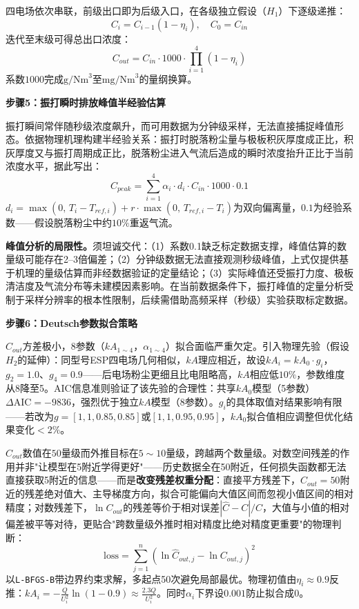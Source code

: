 四电场依次串联，前级出口即为后级入口，在各级独立假设（$H_1$）下逐级递推：
\begin{equation}
    C_i = C_{i-1}(1 - \eta_i),\quad C_0 = C_{in}
\end{equation}
迭代至末级可得总出口浓度：
\begin{equation}
    C_{out} = C_{in} \cdot 1000 \cdot \prod_{i=1}^{4}(1 - \eta_i)
\end{equation}
系数$1000$完成$\text{g/Nm}^3$至$\text{mg/Nm}^3$的量纲换算。

\textbf{步骤5：振打瞬时排放峰值半经验估算}

振打瞬间常伴随秒级浓度飙升，而可用数据为分钟级采样，无法直接捕捉峰值形态。依据物理机理构建半经验关系：振打时脱落粉尘量与极板积灰厚度成正比，积灰厚度又与振打周期成正比，脱落粉尘进入气流后造成的瞬时浓度抬升正比于当前浓度水平，据此写出：
\begin{equation}
    C_{peak} = \sum_{i=1}^{4} \alpha_i \cdot d_i \cdot C_{in} \cdot 1000 \cdot 0.1
\end{equation}
$d_i = \max(0,\, T_i - T_{ref,i}) + r \cdot \max(0,\, T_{ref,i} - T_i)$为双向偏离量，$0.1$为经验系数——假设脱落粉尘中约$10\%$重返气流。

\textbf{峰值分析的局限性。}须坦诚交代：（1）系数0.1缺乏标定数据支撑，峰值估算的数量级可能存在2--3倍偏差；（2）分钟级数据无法直接观测秒级峰值，上式仅提供基于机理的量级估算而非经数据验证的定量结论；（3）实际峰值还受振打力度、极板清洁度及气流分布等未建模因素影响。在当前数据条件下，振打峰值的定量分析受制于采样分辨率的根本性限制，后续需借助高频采样（秒级）实验获取标定数据。

\textbf{步骤6：Deutsch参数拟合策略}

$C_{out}$方差极小，8参数（$kA_{1\sim4}$，$\alpha_{1\sim4}$）拟合面临严重欠定。引入物理先验（假设$H_2$的延伸）：同型号ESP四电场几何相似，$kA$理应相近，故设$kA_i=kA_0\cdot g_i$，$g_2=1.0$、$g_4=0.9$——后电场粉尘更细且比电阻略高，$kA$相应低$10\%$，参数维度从8降至5。AIC信息准则验证了该先验的合理性：共享$kA_0$模型（5参数）$\Delta\text{AIC}=-9836$，强烈优于独立$kA$模型（8参数）。$g_i$的具体取值对结果影响有限——若改为$g=[1,1,0.85,0.85]$或$[1,1,0.95,0.95]$，$kA_0$拟合值相应调整但优化结果变化$<2\%$。

$C_{out}$数值在$50$量级而外推目标在$5\sim10$量级，跨越两个数量级。对数空间残差的作用并非"让模型在5附近学得更好"——历史数据全在50附近，任何损失函数都无法直接获取5附近的信息——而是\textbf{改变残差权重分配}：直接平方残差下，$C_{out}=50$附近的残差绝对值大、主导梯度方向，拟合可能偏向大值区间而忽视小值区间的相对精度；对数残差下，$\ln C_{out}$的残差等价于相对误差$|\hat{C}-C|/C$，大值与小值的相对偏差被平等对待，更贴合"跨数量级外推时相对精度比绝对精度更重要"的物理判断：
\begin{equation}
    \text{loss} = \sum_{j=1}^{n}\left(\ln \hat{C}_{out,j} - \ln C_{out,j}\right)^2
\end{equation}
以\texttt{L-BFGS-B}带边界约束求解\cite{nocedal2006}，多起点50次避免局部最优。物理初值由$\eta_i\approx0.9$反推：$kA_i=-\frac{Q}{U_i^2}\ln(1-0.9)\approx\frac{2.3Q}{U_i^2}$。同时$\alpha_i$下界设$0.001$防止拟合成$0$。

